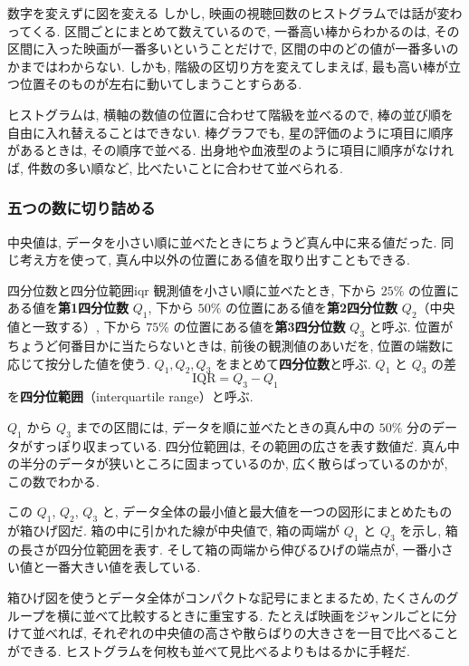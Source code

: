 \begin{mybox}{数字を変えずに図を変える}
    しかし, 映画の視聴回数のヒストグラムでは話が変わってくる.
    区間ごとにまとめて数えているので, 一番高い棒からわかるのは, その区間に入った映画が一番多いということだけで, 区間の中のどの値が一番多いのかまではわからない.
    しかも, 階級の区切り方を変えてしまえば, 最も高い棒が立つ位置そのものが左右に動いてしまうことすらある.

    ヒストグラムは, 横軸の数値の位置に合わせて階級を並べるので, 棒の並び順を自由に入れ替えることはできない.
    棒グラフでも, 星の評価のように項目に順序があるときは, その順序で並べる.
    出身地や血液型のように項目に順序がなければ, 件数の多い順など, 比べたいことに合わせて並べられる.

  \subsubsection*{五つの数に切り詰める}

    中央値は, データを小さい順に並べたときにちょうど真ん中に来る値だった.
    同じ考え方を使って, 真ん中以外の位置にある値を取り出すこともできる.

    \begin{defi}[unbreakable]{四分位数と四分位範囲}{iqr}
      観測値を小さい順に並べたとき, 下から $25\%$ の位置にある値を\textbf{第1四分位数} $Q_1$,
      下から $50\%$ の位置にある値を\textbf{第2四分位数} $Q_2$（中央値と一致する）,
      下から $75\%$ の位置にある値を\textbf{第3四分位数} $Q_3$ と呼ぶ.
      位置がちょうど何番目かに当たらないときは, 前後の観測値のあいだを, 位置の端数に応じて按分した値を使う.
      $Q_1, Q_2, Q_3$ をまとめて\textbf{四分位数}と呼ぶ.
      $Q_1$ と $Q_3$ の差
      \[
        \mathrm{IQR} = Q_3 - Q_1
      \]
      を\textbf{四分位範囲}（interquartile range）と呼ぶ.
    \end{defi}

    $Q_1$ から $Q_3$ までの区間には, データを順に並べたときの真ん中の $50\%$ 分のデータがすっぽり収まっている.
    四分位範囲は, その範囲の広さを表す数値だ.
    真ん中の半分のデータが狭いところに固まっているのか, 広く散らばっているのかが, この数でわかる.

    この $Q_1$, $Q_2$, $Q_3$ と, データ全体の最小値と最大値を一つの図形にまとめたものが箱ひげ図だ.
    箱の中に引かれた線が中央値で, 箱の両端が $Q_1$ と $Q_3$ を示し, 箱の長さが四分位範囲を表す.
    そして箱の両端から伸びるひげの端点が, 一番小さい値と一番大きい値を表している.

    箱ひげ図を使うとデータ全体がコンパクトな記号にまとまるため, たくさんのグループを横に並べて比較するときに重宝する.
    たとえば映画をジャンルごとに分けて並べれば, それぞれの中央値の高さや散らばりの大きさを一目で比べることができる.
    ヒストグラムを何枚も並べて見比べるよりもはるかに手軽だ.


\end{mybox}
